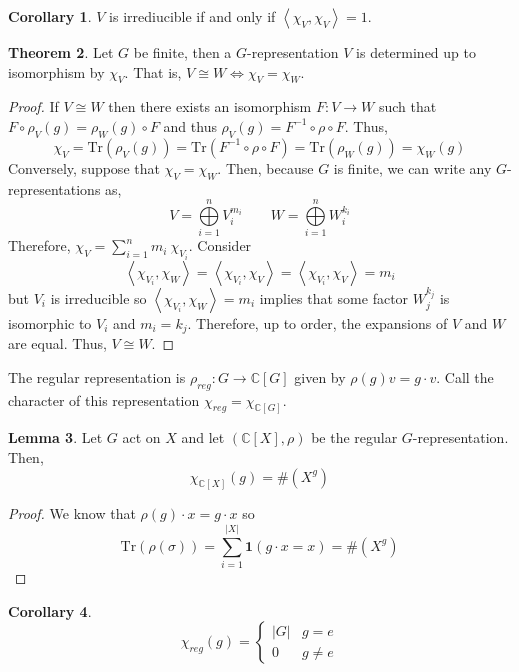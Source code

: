 \documentclass[12pt]{extarticle}
\newcommand{\C}{\mathbb{C}}
\newcommand{\tr}[1]{\mathrm{Tr} \! \left(#1\right)}
\newcommand{\inner}[2]{\left<#1, #2 \right>}
\theoremstyle{definition}
\newtheorem{theorem}{Theorem}[section]
\newtheorem{lemma}[theorem]{Lemma}
\newtheorem{corollary}[theorem]{Corollary}
\newenvironment{definition}[1][Definition:]{\begin{trivlist}
\item[\hskip \labelsep {\bfseries #1}]}{\end{trivlist}}
\begin{document}
\begin{corollary}
$V$ is irrediucible if and only if $\inner{\chi_V}{\chi_V} = 1$.
\end{corollary}

\begin{theorem}
Let $G$ be finite, then a $G$-representation $V$ is determined up to isomorphism by $\chi_V$. That is, $V \cong W \iff \chi_V = \chi_W$. 
\end{theorem}

\begin{proof}
If $V \cong W$ then there exists an isomorphism $F : V \to W$ such that $F \circ \rho_V(g) = \rho_W(g) \circ F$ and thus $\rho_V(g) = F^{-1} \circ \rho \circ F$. Thus, 
\[\chi_V = \tr{\rho_V(g)} = \tr{F^{-1} \circ \rho \circ F} = \tr{\rho_W(g)} = \chi_W(g)\]
Conversely, suppose that $\chi_V = \chi_W$. Then, because $G$ is finite, we can write any $G$-representations as,
\[V = \bigoplus\limits_{i = 1}^n V_i^{m_i} \quad \quad W = \bigoplus\limits_{i = 1}^n W_i^{k_i}\]
Therefore, $\chi_V = \sum\limits_{i = 1}^n m_i \: \chi_{V_i}$. Consider
\[ \inner{\chi_{V_i}}{\chi_W} = \inner{\chi_{V_i}}{\chi_{V}} = \inner{\chi_{V_i}}{\chi_{V}} = m_i\]
but $V_i$ is irreducible so $\inner{\chi_{V_i}}{\chi_W} = m_i$ implies that some factor $W_j^{k_j}$ is isomorphic to $V_i$ and $m_i = k_j$. Therefore, up to order, the expansions of $V$ and $W$ are equal. Thus, $V \cong W$. 
\end{proof}

\begin{definition}
The regular representation is $\rho_{reg} : G \to \C[G]$ given by $\rho(g) v = g \cdot v$. Call the character of this representation $\chi_{reg} = \chi_{\C[G]}$.
\end{definition}

\begin{lemma}
Let $G$ act on $X$ and let $(\C[X], \rho)$ be the regular $G$-representation. Then,
\[\chi_{\C[X]}(g) = \#(X^g)\]
\end{lemma}

\begin{proof}
We know that $\rho(g) \cdot x = g \cdot x$ so
\[\tr{\rho(\sigma)} = \sum_{i = 1}^{|X|} \mathbf{1}(g \cdot x = x) = \#(X^g)\]
\end{proof}

\begin{corollary}
\[\chi_{reg}(g) =
\begin{cases}
|G| & g = e \\
0 & g \neq e
\end{cases}\] 
\end{corollary}
\end{document}

